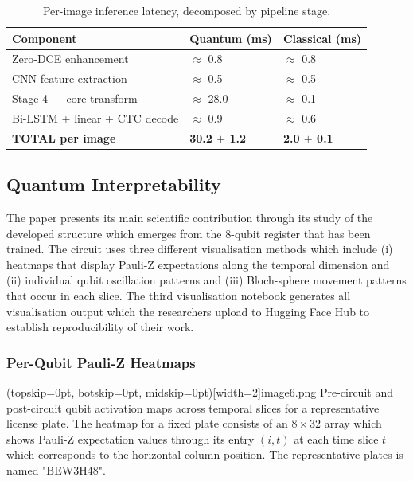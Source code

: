 \documentclass{ieeeaccess}
\begin{document}
\begin{table}[h]
\centering
\caption{Per-image inference latency, decomposed by pipeline stage.}
\label{tab:latency}
\begin{tabularx}{\columnwidth}{@{}lXX@{}}
\toprule
\textbf{Component} & \textbf{Quantum (ms)} & \textbf{Classical (ms)} \\
\midrule
Zero-DCE enhancement & $\approx$ 0.8 & $\approx$ 0.8 \\
CNN feature extraction & $\approx$ 0.5 & $\approx$ 0.5 \\
Stage 4 — core transform & $\approx$ 28.0 & $\approx$ 0.1 \\
Bi-LSTM + linear + CTC decode & $\approx$ 0.9 & $\approx$ 0.6 \\
\textbf{TOTAL per image} & \textbf{30.2 $\pm$ 1.2} & \textbf{2.0 $\pm$ 0.1} \\
\bottomrule
\end{tabularx}
\end{table}

\subsection{Quantum Interpretability}
The paper presents its main scientific contribution through its study of the developed structure which emerges from the 8-qubit register that has been trained. The circuit uses three different visualisation methods which include (i) heatmaps that display Pauli-Z expectations along the temporal dimension and (ii) individual qubit oscillation patterns and (iii) Bloch-sphere movement patterns that occur in each slice. The third visualisation notebook generates all visualisation output which the researchers upload to Hugging Face Hub to establish reproducibility of their work.

\subsubsection{Per-Qubit Pauli-Z Heatmaps}
\Figure[htbp](topskip=0pt, botskip=0pt, midskip=0pt)[width=2\columnwidth]{image6.png}
{Pre-circuit and post-circuit qubit activation maps across temporal slices for a representative license plate.\label{fig:heatmaps}}
The heatmap for a fixed plate consists of an $8 \times 32$ array which shows Pauli-Z expectation values through its entry $(i, t)$ at each time slice $t$ which corresponds to the horizontal column position. The representative plates is named "BEW3H48". 
 
\end{document}
